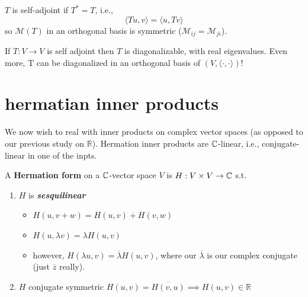 \documentclass[12pt,oneside]{report}
\begin{document}




\begin{definition}
  \( T \) is self-adjoint if \( T^* = T \), i.e., 
  \begin{displaymath}
    \langle T u , v \rangle = \langle u,Tv \rangle 
  \end{displaymath}
  so \( \mathcal{M}(T) \) in an orthogonal basis is symmetric (\( \mathcal{M}_{ij}=\mathcal{M}_{ji} \)). 
\end{definition}



\begin{theorem}  
  If \( T : V \to  V  \) is self adjoint then \( T \) is diagonalizable, with real eigenvalues. Even more, T can be diagonalized in an orthogonal basis of \( ( V, \langle \cdot , \cdot  \rangle ) \)!  

\end{theorem}



\section{hermatian inner products}

We now wish to real with inner products on complex vector spaces (as opposed to our previous study on \( \mathbb{R} \)). Hermation inner products are \( \CC \)-linear, i.e., conjugate-linear in one of the inpts. 

\begin{definition}
A \textbf{Hermation form} on a \( \CC \)-vector space \( V \) is \( H: V\times V \to  \CC[] \) s.t.
\begin{enumerate}
  \item \( H \) is \textbf{\textit{sesquilinear}}
    \begin{itemize}
      \item \( H(u,v+w)=H(u,v)+H(v,w)\)
      \item \( H( u, \lambda v) =\lambda  H (u,v)\)
      \item however, \( H(\lambda u, v)= \overline{\lambda }  H(u,v) \), where our \( \overline{\lambda }  \) is our complex conjugate (just \( \overline{z}  \) really). 
    \end{itemize}
  \item \( H \) conjugate symmetric \( H(u,v)=\overline{H(v,u)} \implies H(u,v) \in  \mathbb{R} \)
\end{enumerate}
\end{definition}
\end{document}
